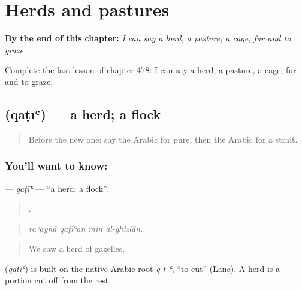 
\chapter{Herds and pastures}
\label{ch:ar-herds-and-pastures}

\begin{chapteropening}
\textbf{By the end of this chapter:} \emph{I can say a herd, a pasture, a cage, fur and to graze.}

Complete the last lesson of chapter 478: I can say a herd, a pasture, a cage, fur and to graze.
\end{chapteropening}

\section[\texorpdfstring{\ar{قطيع} (qaṭīʿ)}{قطيع (qaṭīʿ)}]{ (qaṭīʿ) — a herd; a flock}

\label{lesson:AR-C478-qati}



\begin{quote}
Before the new one: say the Arabic for pure, then the Arabic for a strait.
\end{quote}

\subsection*{You'll want to know: }
\textbf{} — \emph{qaṭīʿ} — \textquotedblleft{}a herd; a flock\textquotedblright{}.

\begin{quote}
   .
\end{quote}

\begin{quote}
\emph{raʾaynā qaṭīʿan min al-ghizlān.}
\end{quote}

\begin{quote}
We saw a herd of gazelles.
\end{quote}

\begin{cousinweb}
\textbf{} (\emph{qaṭīʿ}) is built on the native Arabic root \emph{q-ṭ-ʿ}, \textquotedblleft{}to cut\textquotedblright{} (Lane). A herd is a portion cut off from the rest.
\end{cousinweb}

